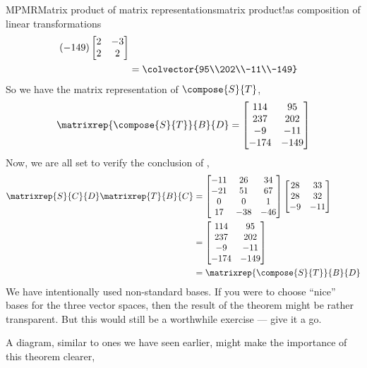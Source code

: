 \begin{example}{MPMR}{Matrix product of matrix representations}{matrix product!as composition of linear transformations}
\begin{align*}
{(-149)\begin{bmatrix} 2 & -3 \\ 2 & 2\end{bmatrix}
}\\
&=\colvector{95\\202\\-11\\-149}\\
%
\end{align*}
%
So we have the matrix representation of $\compose{S}{T}$,
%
\begin{equation*}
\matrixrep{\compose{S}{T}}{B}{D}=
\begin{bmatrix}
 114 & 95 \\
 237 & 202 \\
 -9 & -11 \\
 -174 & -149
\end{bmatrix}
\end{equation*}
%
Now, we are all set to verify the conclusion of ,
%
\begin{align*}
\matrixrep{S}{C}{D}\matrixrep{T}{B}{C}
&=
\begin{bmatrix}
 -11 & 26 & 34 \\
 -21 & 51 & 67 \\
 0 & 0 & 1 \\
 17 & -38 & -46
\end{bmatrix}
%
\begin{bmatrix}
 28 & 33 \\
 28 & 32 \\
 -9 & -11
\end{bmatrix}\\
&=
\begin{bmatrix}
 114 & 95 \\
 237 & 202 \\
 -9 & -11 \\
 -174 & -149
\end{bmatrix}\\
&=\matrixrep{\compose{S}{T}}{B}{D}
\end{align*}
%
We have intentionally used non-standard bases.  If you were to choose ``nice'' bases for the three vector spaces, then the result of the theorem might be rather transparent.  But this would still be a worthwhile exercise --- give it a go.
%
\end{example}
%
A diagram, similar to ones we have seen earlier, might make the importance of this theorem clearer,
%
%
